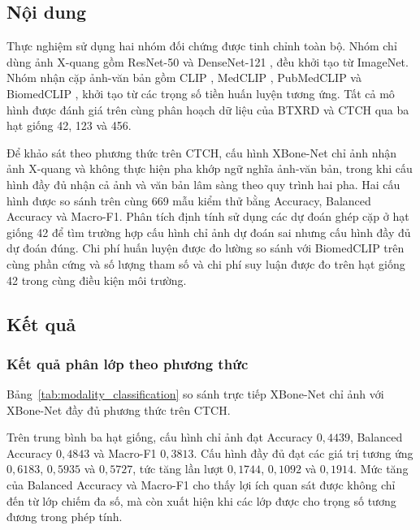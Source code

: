 \subsection{Nội dung}
Thực nghiệm sử dụng hai nhóm đối chứng được tinh chỉnh toàn bộ. Nhóm chỉ dùng ảnh X-quang gồm ResNet-50 \cite{ResNet} và DenseNet-121 \cite{DenseNet}, đều khởi tạo từ ImageNet. Nhóm nhận cặp ảnh-văn bản gồm CLIP \cite{CLIP}, MedCLIP \cite{MedCLIP}, PubMedCLIP \cite{PubMedCLIP} và BiomedCLIP \cite{BiomedCLIP}, khởi tạo từ các trọng số tiền huấn luyện tương ứng. Tất cả mô hình được đánh giá trên cùng phân hoạch dữ liệu của BTXRD và CTCH qua ba hạt giống 42, 123 và 456.

Để khảo sát theo phương thức trên CTCH, cấu hình XBone-Net chỉ ảnh nhận ảnh X-quang và không thực hiện pha khớp ngữ nghĩa ảnh-văn bản, trong khi cấu hình đầy đủ nhận cả ảnh và văn bản lâm sàng theo quy trình hai pha. Hai cấu hình được so sánh trên cùng 669 mẫu kiểm thử bằng Accuracy, Balanced Accuracy và Macro-F1. Phân tích định tính sử dụng các dự đoán ghép cặp ở hạt giống 42 để tìm trường hợp cấu hình chỉ ảnh dự đoán sai nhưng cấu hình đầy đủ dự đoán đúng. Chi phí huấn luyện được đo lường so sánh với BiomedCLIP trên cùng phần cứng và số lượng tham số và chi phí suy luận được đo trên hạt giống 42 trong cùng điều kiện môi trường.

\subsection{Kết quả}

\subsubsection{Kết quả phân lớp theo phương thức}
\label{subsec:modality_classification_results}
Bảng~\ref{tab:modality_classification} so sánh trực tiếp XBone-Net chỉ ảnh với XBone-Net đầy đủ phương thức trên CTCH.



\pagebreak

Trên trung bình ba hạt giống, cấu hình chỉ ảnh đạt Accuracy $0{,}4439$, Balanced Accuracy $0{,}4843$ và Macro-F1 $0{,}3813$. Cấu hình đầy đủ đạt các giá trị tương ứng $0{,}6183$, $0{,}5935$ và $0{,}5727$, tức tăng lần lượt $0{,}1744$, $0{,}1092$ và $0{,}1914$. Mức tăng của Balanced Accuracy và Macro-F1 cho thấy lợi ích quan sát được không chỉ đến từ lớp chiếm đa số, mà còn xuất hiện khi các lớp được cho trọng số tương đương trong phép tính.

